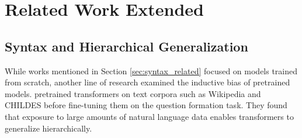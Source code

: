 





\section{Related Work Extended}
\label{appdx:related}
\subsection{Syntax and Hierarchical Generalization}
While works mentioned in Section \ref{sec:syntax_related} focused on models trained from scratch, another line of research examined the inductive bias of pretrained models. \citet{Mueller2024-qz, Mueller2023-xq} pretrained transformers on text corpora such as Wikipedia and CHILDES \citep{MacWhinney2014-jq} before fine-tuning them on the question formation task. They found that exposure to large amounts of natural language data enables transformers to generalize hierarchically.



